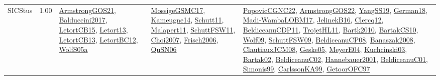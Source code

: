 {\begin{longtable}{p{3cm}r>{\raggedright\arraybackslash}p{6cm}>{\raggedright\arraybackslash}p{6cm}>{\raggedright\arraybackslash}p{8cm}}
\index{SICStus}\index{CPSystems!SICStus}SICStus &  1.00 & \hyperref[detail:ArmstrongGOS21]{ArmstrongGOS21}, \hyperref[detail:Balduccini2017]{Balduccini2017}, \hyperref[detail:LetortCB15]{LetortCB15}, \hyperref[detail:Letort13]{Letort13}, \hyperref[detail:LetortCB13]{LetortCB13}, \hyperref[detail:LetortBC12]{LetortBC12}, \hyperref[detail:WolfS05a]{WolfS05a} & \hyperref[detail:MossigeGSMC17]{MossigeGSMC17}, \hyperref[detail:Kameugne14]{Kameugne14}, \hyperref[detail:Schutt11]{Schutt11}, \hyperref[detail:Malapert11]{Malapert11}, \hyperref[detail:SchuttFSW11]{SchuttFSW11}, \hyperref[detail:Choi2007]{Choi2007}, \hyperref[detail:Frisch2006]{Frisch2006}, \hyperref[detail:QuSN06]{QuSN06} & \hyperref[detail:PopovicCGNC22]{PopovicCGNC22}, \hyperref[detail:ArmstrongGOS22]{ArmstrongGOS22}, \hyperref[detail:YangSS19]{YangSS19}, \hyperref[detail:German18]{German18}, \hyperref[detail:Madi-WambaLOBM17]{Madi-WambaLOBM17}, \hyperref[detail:JelinekB16]{JelinekB16}, \hyperref[detail:Clercq12]{Clercq12}, \hyperref[detail:BeldiceanuCDP11]{BeldiceanuCDP11}, \hyperref[detail:TrojetHL11]{TrojetHL11}, \hyperref[detail:Bartk2010]{Bartk2010}, \hyperref[detail:BartakCS10]{BartakCS10}, \hyperref[detail:Wolf09]{Wolf09}, \hyperref[detail:SchuttFSW09]{SchuttFSW09}, \hyperref[detail:BeldiceanuCP08]{BeldiceanuCP08}, \hyperref[detail:Banaszak2008]{Banaszak2008}, \hyperref[detail:ClautiauxJCM08]{ClautiauxJCM08}, \hyperref[detail:Geske05]{Geske05}, \hyperref[detail:MeyerE04]{MeyerE04}, \hyperref[detail:Kuchcinski03]{Kuchcinski03}, \hyperref[detail:Bartak02]{Bartak02}, \hyperref[detail:BeldiceanuC02]{BeldiceanuC02}, \hyperref[detail:Hannebauer2001]{Hannebauer2001}, \hyperref[detail:BeldiceanuC01]{BeldiceanuC01}, \hyperref[detail:Simonis99]{Simonis99}, \hyperref[detail:CarlssonKA99]{CarlssonKA99}, \hyperref[detail:GetoorOFC97]{GetoorOFC97}\\

\end{longtable}}
